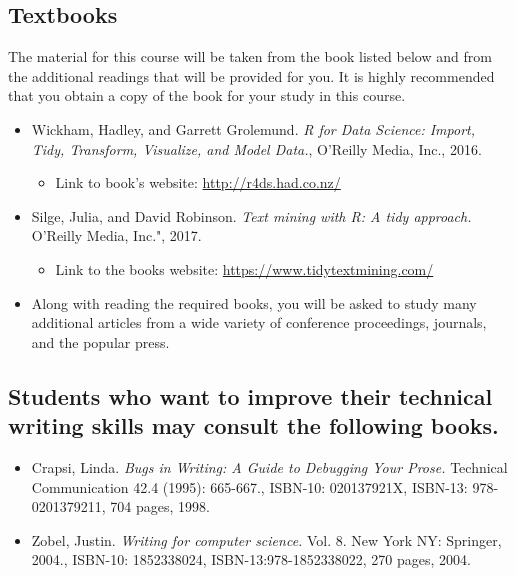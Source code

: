 \documentclass[11pt]{article} %
\begin{document}
\subsection*{\textbf{Textbooks}}

The material for this course will be taken from the book listed below and from the additional readings that will be provided for you. It is highly recommended that you obtain a copy of the book for your study in this course.


\begin{itemize}

\item Wickham, Hadley, and Garrett Grolemund. \emph{R for Data Science: Import, Tidy, Transform, Visualize, and Model Data.}, O'Reilly Media, Inc., 2016.
	\begin{itemize}
		\item Link to book's website: \url{http://r4ds.had.co.nz/}
	\end{itemize}

\item Silge, Julia, and David Robinson. \emph{Text mining with R: A tidy approach.} O'Reilly Media, Inc.", 2017.
\begin{itemize}
	\item Link to the books website: \url{https://www.tidytextmining.com/}
\end{itemize}

\item Along with reading the required books, you will be asked to study many additional articles from a wide variety of conference proceedings, journals, and the popular press.

\end{itemize}


\subsection*{\textbf{Students who want to improve their technical writing skills may consult the following books.}}

\begin{itemize}

	\item Crapsi, Linda. \emph{Bugs in Writing: A Guide to Debugging Your Prose.} Technical Communication 42.4 (1995): 665-667.,  ISBN-10: 020137921X, ISBN-13: 978-0201379211, 704 pages, 1998.

	\item Zobel, Justin. \emph{Writing for computer science.} Vol. 8. New York NY: Springer, 2004.,  ISBN-10: 1852338024, ISBN-13:978-1852338022, 270 pages, 2004.

\end{itemize}
\end{document}
